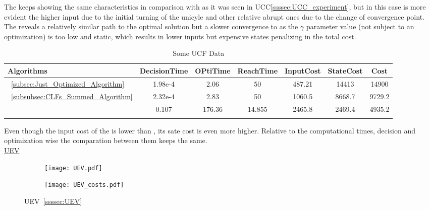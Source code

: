 The  keeps showing the same characteristics in comparison with  as it was seen in UCC\ref{ssssec:UCC_experiment}, but in this case is more evident the higher input due to the initial turning of the unicyle and other relative abrupt ones due to the change of convergence point. The  reveals a relatively similar path to the optimal solution but a slower convergence to \txtref as the \(\gamma\) parameter value (not subject to an optimization) is too low and static, which results in lower inputs but expensive states penalizing in the total cost. \\ 

\vspace{5em}


  \bgroup
 \begin{xltabular}{\textwidth}{|l|cccccc|}
   \toprule
   Algorithms   & DecisionTime & OPtiTime & ReachTime  & InputCost   & StateCost & Cost           \\
   \midrule
    ~\ref{subsec:Just_Optimized_Algorithm}           & 1.98e-4 & 2.06 & 50 & 487.21 & 14413 & 14900 \\
    ~\ref{subsubsec:CLFs_Summed_Algorithm}        & 2.32e-4 & 2.83 & 50 & 1060.5 & 8668.7 & 9729.2 \\
                                                      & 0.107   &176.36&14.855&2465.8& 2469.4 & 4935.2 \\
    \midrule
    \caption{Some UCF Data}
    \label{tab:Some_UCF_Data}\\
   \end{xltabular}
 \egroup

Even though the input cost of the  is lower than , its sate cost is even more higher. Relative to the computational times, decision and optimization wise the comparation between them keeps the same. \\


\underline{UEV}
\label{ssssec:UEV_experiments} %

 \begin{figure}[htbp]
  \begin{subfigure}{0.5\textwidth}
    \centering
    \texttt{[image: UEV.pdf]}
  \label{fig:UEV_CostEvol}
  \end{subfigure}
  \begin{subfigure}{0.6\textwidth}
    \centering
    \texttt{[image: UEV\_costs.pdf]}
  \label{fig:UEV_trajectory}
  \end{subfigure}
  \caption{UEV~\ref{ssssec:UEV}}
\label{fig:UEVTrajectory_and_CostEvol}
\end{figure}

